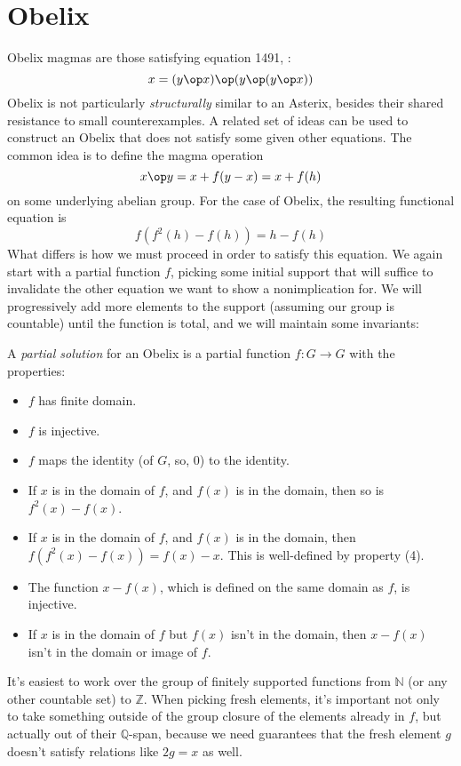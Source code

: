 \section{Obelix}
Obelix magmas are those satisfying equation 1491, :
$$x = (y \op x) \op (y \op (y \op x))$$
Obelix is not particularly {\em structurally} similar to an Asterix, besides their shared resistance
to small counterexamples. A related set of ideas can be used to construct an Obelix that does not
satisfy some given other equations. The common idea is to define the magma operation
$$ x \op y = x + f(y-x) = x + f(h)$$
on some underlying abelian group. For the case of Obelix, the resulting functional equation is
\begin{equation}\label{fh2}
  f(f^{2}(h) - f(h)) = h - f(h)
\end{equation}
What differs is how we must proceed in order to satisfy this equation. We again start with a partial function $f$,
picking some initial support that will suffice to invalidate the other equation we want to show a nonimplication for.
We will progressively add more elements to the support (assuming our group is countable) until the function
is total, and we will maintain some invariants:
\begin{definition}\label{partial-solution2}  A \emph{partial solution} for an Obelix is a partial function $f : G \to G$
with the properties:
\begin{itemize}
  \item $f$ has finite domain.
  \item $f$ is injective.
  \item $f$ maps the identity (of $G$, so, 0) to the identity.
  \item If $x$ is in the domain of $f$, and $f(x)$ is in the domain, then so is $f^2(x) - f(x)$.
  \item If $x$ is in the domain of $f$, and $f(x)$ is in the domain, then $f(f^2(x) - f(x)) = f(x) - x$. This is well-defined by property (4).
  \item The function $x - f(x)$, which is defined on the same domain as $f$, is injective.
  \item If $x$ is in the domain of $f$ but $f(x)$ isn't in the domain, then $x - f(x)$ isn't in the domain or image of $f$.
\end{itemize}
\end{definition}
It's easiest to work over the group of finitely supported functions from $\mathbb{N}$ (or any other
countable set) to $\mathbb{Z}$. When picking fresh elements, it's important not only to take something
outside of the group closure of the elements already in $f$, but actually out of their $\mathbb{Q}$-span,
because we need guarantees that the fresh element $g$ doesn't satisfy relations like $2g = x$ as well.

